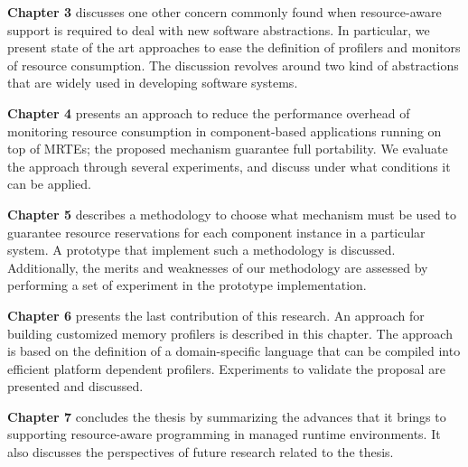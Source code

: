 \textbf{Chapter 3} discusses one other concern commonly found when resource-aware support is required to deal with new software abstractions.
In particular, we present state of the art approaches to ease the definition of profilers and monitors of resource consumption.
The discussion revolves around two kind of abstractions that are widely used in developing software systems.

\textbf{Chapter 4} presents an approach to reduce the performance overhead of monitoring resource consumption in component-based applications running on top of MRTEs; the proposed mechanism guarantee full portability.
We evaluate the approach through several experiments, and discuss under what conditions it can be applied.

\textbf{Chapter 5} describes a methodology to choose what mechanism must be used to guarantee resource reservations for each component instance in a particular system.
A prototype that implement such a methodology is discussed.
Additionally, the merits and weaknesses of our methodology are assessed by performing a set of experiment in the prototype implementation.

\textbf{Chapter 6} presents the last contribution of this research.
An approach for building customized memory profilers is described in this chapter.
The approach is based on the definition of a domain-specific language that can be compiled into efficient platform dependent profilers.
Experiments to validate the proposal are presented and discussed.

\textbf{Chapter 7} concludes the thesis by summarizing the advances that it brings to supporting resource-aware programming in managed runtime environments.
It also discusses the perspectives of future research related to the thesis.

